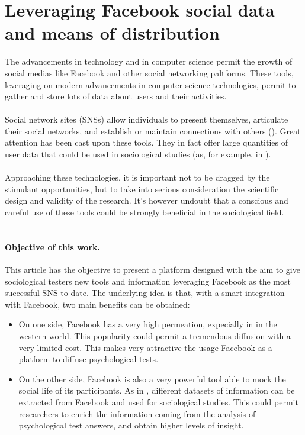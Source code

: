 \section{Leveraging Facebook social data and means of distribution}
The advancements in technology and in computer science permit the growth of social medias like Facebook and other social networking paltforms.
These tools, leveraging on modern advancements in computer science technologies, permit to gather and store lots of data about users and their activities.\\
\\
Social network sites (SNSs) allow individuals to present themselves, articulate their social networks, and establish or maintain connections with others
(\cite{Boyd-2007}).
Great attention has been cast upon these tools.
They in fact offer large quantities of user data that could be used in sociological studies (as, for example, in \cite{Ellison-2007}).\\
\\
Approaching these technologies, it is important not to be dragged by the stimulant opportunities, but to take into serious consideration the scientific design and
validity of the research.
It's however undoubt that a conscious and careful use of these tools could be strongly beneficial in the sociological field.\\
\\
\paragraph{Objective of this work.}
This article has the objective to present a platform designed with the aim to give sociological testers new tools and
information leveraging Facebook as the most successful SNS to date.
The underlying idea is that, with a smart integration with Facebook, two main benefits can be obtained:

\begin{itemize}
\item On one side, Facebook has a very high permeation, expecially in in the western world.
This popularity could permit a tremendous diffusion with a very limited cost.
This makes very attractive the usage Facebook as a platform to diffuse psychological tests.
\item On the other side, Facebook is also a very powerful tool able to mock the social life of its participants.
As in \cite{Lewis-2008}, different datasets of information can be extracted from Facebook and used for sociological studies.
This could permit researchers to enrich the information coming from the analysis of psychological test answers, and obtain higher levels of insight.
\end{itemize}

